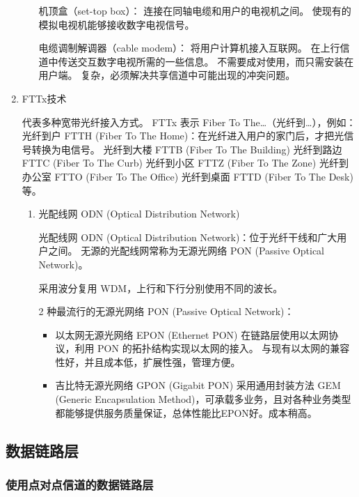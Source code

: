 \documentclass[11pt]{article}
\begin{document}
\begin{enumerate}
\begin{enumerate}
机顶盒（set-top box）：
  连接在同轴电缆和用户的电视机之间。
  使现有的模拟电视机能够接收数字电视信号。

电缆调制解调器（cable modem）：
  将用户计算机接入互联网。
  在上行信道中传送交互数字电视所需的一些信息。
  不需要成对使用，而只需安装在用户端。
  复杂，必须解决共享信道中可能出现的冲突问题。
\end{enumerate}
\item FTTx技术
\label{sec:org33dac3c}

代表多种宽带光纤接入方式。
FTTx 表示 Fiber To The…（光纤到…），例如：
光纤到户 FTTH (Fiber To The Home)：在光纤进入用户的家门后，才把光信号转换为电信号。
光纤到大楼 FTTB (Fiber To The Building)
光纤到路边 FTTC (Fiber To The Curb)
光纤到小区 FTTZ (Fiber To The Zone)
光纤到办公室 FTTO (Fiber To The Office)
光纤到桌面 FTTD (Fiber To The Desk) 等。
\begin{enumerate}
\item 光配线网 ODN (Optical Distribution Network)
\label{sec:org994d659}

光配线网 ODN (Optical Distribution Network)：位于光纤干线和广大用户之间。
无源的光配线网常称为无源光网络 PON (Passive Optical Network)。

采用波分复用 WDM，上行和下行分别使用不同的波长。

2 种最流行的无源光网络 PON (Passive Optical Network)：
\begin{itemize}
\item 以太网无源光网络 EPON (Ethernet PON)
在链路层使用以太网协议，利用 PON 的拓扑结构实现以太网的接入。
与现有以太网的兼容性好，并且成本低，扩展性强，管理方便。
\item 吉比特无源光网络 GPON (Gigabit PON)
采用通用封装方法 GEM (Generic Encapsulation Method)，可承载多业务，且对各种业务类型都能够提供服务质量保证，总体性能比EPON好。成本稍高。
\end{itemize}
\end{enumerate}
\end{enumerate}
\subsection{数据链路层}
\label{sec:org3f07715}

\subsubsection{使用点对点信道的数据链路层}
\label{sec:orgdcffdca}
\end{document}
